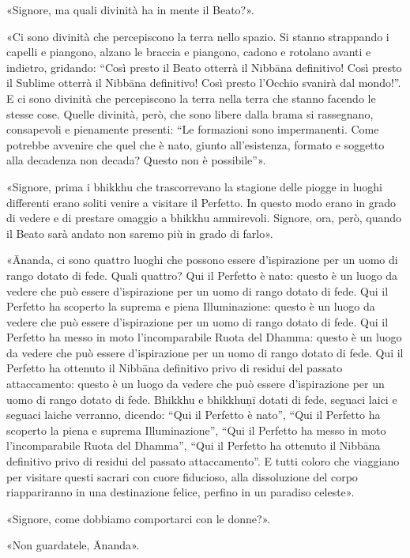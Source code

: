 «Signore, ma quali divinità ha in mente il Beato?».


«Ci sono divinità che percepiscono la terra nello spazio. Si stanno
strappando i capelli e piangono, alzano le braccia e piangono, cadono e
rotolano avanti e indietro, gridando: “Così presto il Beato otterrà il
Nibbāna definitivo! Così presto il Sublime otterrà il Nibbāna
definitivo! Così presto l’Occhio svanirà dal mondo!”. E ci sono divinità
che percepiscono la terra nella terra che stanno facendo le stesse cose.
Quelle divinità, però, che sono libere dalla brama si rassegnano,
consapevoli e pienamente presenti: “Le formazioni sono impermanenti.
Come potrebbe avvenire che quel che è nato, giunto all’esistenza,
formato e soggetto alla decadenza non decada? Questo non è possibile”».


«Signore, prima i bhikkhu che trascorrevano la stagione delle piogge in
luoghi differenti erano soliti venire a visitare il Perfetto. In questo
modo erano in grado di vedere e di prestare omaggio a bhikkhu
ammirevoli. Signore, ora, però, quando il Beato sarà andato non saremo
più in grado di farlo».


«Ānanda, ci sono quattro luoghi che possono essere d’ispirazione per un
uomo di rango dotato di fede. Quali quattro? Qui il Perfetto è nato:
questo è un luogo da vedere che può essere d’ispirazione per un uomo di
rango dotato di fede. Qui il Perfetto ha scoperto la suprema e piena
Illuminazione: questo è un luogo da vedere che può essere d’ispirazione
per un uomo di rango dotato di fede. Qui il Perfetto ha messo in moto
l’incomparabile Ruota del Dhamma: questo è un luogo da vedere che può
essere d’ispirazione per un uomo di rango dotato di fede. Qui il
Perfetto ha ottenuto il Nibbāna definitivo privo di residui del passato
attaccamento: questo è un luogo da vedere che può essere d’ispirazione
per un uomo di rango dotato di fede. Bhikkhu e bhikkhuṇī dotati di fede,
seguaci laici e seguaci laiche verranno, dicendo: “Qui il Perfetto è
nato”, “Qui il Perfetto ha scoperto la piena e suprema Illuminazione”,
“Qui il Perfetto ha messo in moto l’incomparabile Ruota del Dhamma”,
“Qui il Perfetto ha ottenuto il Nibbāna definitivo privo di residui del
passato attaccamento”. E tutti coloro che viaggiano per visitare questi
sacrari con cuore fiducioso, alla dissoluzione del corpo riappariranno
in una destinazione felice, perfino in un paradiso celeste».


«Signore, come dobbiamo comportarci con le donne?».


«Non guardatele, Ānanda».


